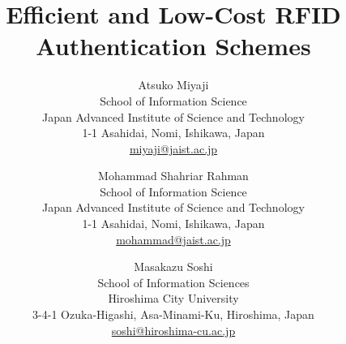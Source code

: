 \documentclass{easychair}
\begin{document}
\title{Efficient and Low-Cost RFID Authentication Schemes}



\author{Atsuko Miyaji\\
School of Information Science\\
Japan Advanced Institute of Science and Technology\\
1-1 Asahidai, Nomi, Ishikawa, Japan\\
\url{miyaji@jaist.ac.jp}\\
\and
Mohammad Shahriar Rahman\\
School of Information Science\\
Japan Advanced Institute of Science and Technology\\
1-1 Asahidai, Nomi, Ishikawa, Japan\\
\url{mohammad@jaist.ac.jp}\\
\and
Masakazu Soshi\\
School of Information Sciences\\
Hiroshima City University\\
3-4-1 Ozuka-Higashi, Asa-Minami-Ku, Hiroshima, Japan\\
\url{soshi@hiroshima-cu.ac.jp}\\
}

\end{document}
